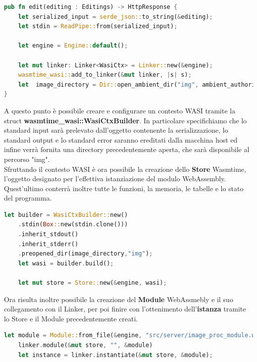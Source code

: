 \begin{lstlisting}[language=rust, caption={File handlers.rs: operazioni preliminari}, showstringspaces=false]
pub fn edit(editing : Editings) -> HttpResponse {
    let serialized_input = serde_json::to_string(&editing);
    let stdin = ReadPipe::from(serialized_input);
    
    let engine = Engine::default();
    
    let mut linker: Linker<WasiCtx> = Linker::new(&engine);
    wasmtime_wasi::add_to_linker(&mut linker, |s| s); 
    let  image_directory = Dir::open_ambient_dir("img", ambient_authority());
}
\end{lstlisting}
A questo punto è possibile creare e configurare un contesto WASI tramite la struct \textbf{wasmtime\_wasi::WasiCtxBuilder}.
In particolare specifichiamo che lo standard input sarà prelevato dall'oggetto contenente la serializzazione, lo standard output e lo standard error saranno ereditati dalla macchina host ed infine verrà fornita una directory precedentemente aperta, che sarà disponibile al percorso "img".
\\Sfruttando il contesto WASI è ora possibile la creazione dello \textbf{Store} Wasmtime, l'oggetto designato per l'effettiva istanziazione del modulo WebAssembly. Quest'ultimo conterrà inoltre tutte le funzioni, la memoria, le tabelle e lo stato del programma.
\begin{lstlisting}[language=rust,caption={File handlers.rs: creazione di contesto WASI e Store}, showstringspaces=false]
    let builder = WasiCtxBuilder::new()
    .stdin(Box::new(stdin.clone()))
    .inherit_stdout()
    .inherit_stderr()
    .preopened_dir(image_directory,"img");
    let wasi = builder.build();
    
    let mut store = Store::new(&engine, wasi);
\end{lstlisting}
Ora risulta inoltre possibile la creazione del \textbf{Module} WebAssmebly e il suo collegamento con il Linker, per poi finire con l'ottenimento dell'\textbf{istanza} tramite lo Store e il Module precedentemente creati.
\begin{lstlisting}[language=rust,caption={File handlers.rs: istanziazione modulo Wasm}, showstringspaces=false]
    let module = Module::from_file(&engine, "src/server/image_proc_module.wasm");
    linker.module(&mut store, "", &module) 
    let instance = linker.instantiate(&mut store, &module);
\end{lstlisting}
